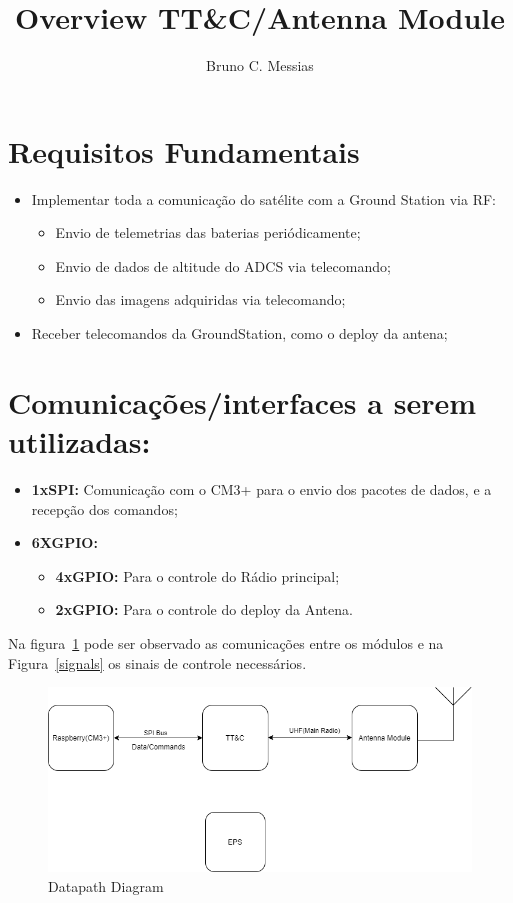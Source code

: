 \documentclass{article}
\title{Overview TT\&C/Antenna Module}
\author{Bruno C. Messias}
\date{}
\begin{document}
\maketitle

\section{Requisitos Fundamentais}

\begin{itemize}
    \item Implementar toda a comunicação do satélite com a Ground Station via RF:
    \begin{itemize}
        \item Envio de telemetrias das baterias periódicamente;
        \item Envio de dados de altitude do ADCS via telecomando;
        \item Envio das imagens adquiridas via telecomando;
    \end{itemize}
    \item Receber telecomandos da GroundStation, como o deploy da antena;
\end{itemize}

\section{Comunicações/interfaces a serem utilizadas:}

\begin{itemize}
    \item \textbf{1xSPI:} Comunicação com o CM3+ para o envio dos pacotes de dados, e a recepção dos comandos;
    \item \textbf{6XGPIO:}
        \begin{itemize}
            \item \textbf{4xGPIO:} Para o controle do Rádio principal;
            \item \textbf{2xGPIO:} Para o controle do deploy da Antena.
        \end{itemize}
\end{itemize}

Na figura~\ref{datapath} pode ser observado as comunicações entre os módulos e na Figura~\ref{signals} os sinais de controle necessários. 

\begin{figure}[htbp]
    \centering
    \includegraphics[scale=.5]{Datapath.png}
    \caption{Datapath Diagram}
    \label{datapath}
\end{figure}
\end{document}
